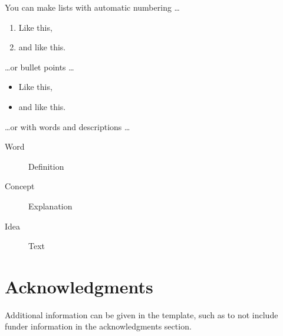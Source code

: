 \documentclass[fleqn,10pt]{olplainarticle}
\begin{document}
You can make lists with automatic numbering \dots

\begin{enumerate}[noitemsep] 
\item Like this,
\item and like this.
\end{enumerate}
\dots or bullet points \dots
\begin{itemize}[noitemsep] 
\item Like this,
\item and like this.
\end{itemize}
\dots or with words and descriptions \dots
\begin{description}
\item[Word] Definition
\item[Concept] Explanation
\item[Idea] Text
\end{description}

\section*{Acknowledgments}

Additional information can be given in the template, such as to not include funder information in the acknowledgments section.


\end{document}
